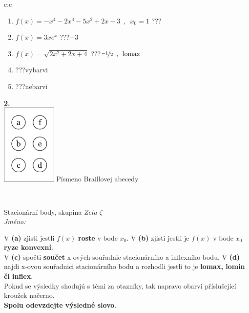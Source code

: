 \documentclass[10pt]{report}
\begin{document}
\begin{tabular}{c:c}
\begin{minipage}[c][104.5mm][t]{0.5\linewidth}
\begin{center}
\begin{minipage}{0.79\linewidth}
\begin{center}
\begin{varwidth}{\linewidth}
\begin{enumerate}
\item $f(x)=-x^4-2x^3-5x^2+2x-3\enspace , \enspace x_0=1$\quad \dotfill\; ???\;\dotfill \quad {}
\item $f(x)=3xe^{x}$\quad \dotfill\; ???\;\dotfill \quad $-3$
\item $f(x)=\sqrt{2x^2+2x+4}$\quad \dotfill\; ???\;\dotfill \quad $\nicefrac{-1}{2}\enspace , \enspace\mathrm{lomax}$
\item \quad \dotfill\; ???\;\dotfill \quad vybarvi
\item \quad \dotfill\; ???\;\dotfill \quad nebarvi
\end{enumerate}
\end{varwidth}
\end{center}
\end{minipage}
\begin{minipage}{0.20\linewidth}
\begin{center}
{\Huge\bfseries 2.} \\[2mm]
\includegraphics[height=40mm]{../images/braille.png}
{\small Písmeno Braillovej abecedy}
\end{center}
\end{minipage}
\end{center}
\end{minipage}
\\ \hdashline
\begin{minipage}[c][104.5mm][t]{0.5\linewidth}
\begin{center}
\vspace{7mm}
{\huge Stacionární body, skupina \textit{Zeta $\zeta$} -}\\[5mm]
\textit{Jméno:}\phantom{xxxxxxxxxxxxxxxxxxxxxxxxxxxxxxxxxxxxxxxxxxxxxxxxxxxxxxxxxxxxxxxxx}\\[5mm]
\begin{minipage}{0.95\linewidth}
\begin{center}
{\small V \textbf{(a)} zjisti jestli $f(x)$ \textbf{roste} v bode $x_0$. V \textbf{(b)} zjisti jestli je $f(x)$ v bode $x_0$ \textbf{ryze konvexní}.\\V \textbf{(c)} spočti \textbf{součet} x-ových souřadnic stacionárního a inflexního bodu. V \textbf{(d)} najdi x-ovou souřadnici stacionárního bodu a rozhodli jestli to je \textbf{lomax, lomin či inflex}.\\Pokud se výsledky shodujú s těmi za otazníky, tak napravo obarvi příslušející kroužek načerno.\\\textbf{Spolu odevzdejte výsledné slovo}}.

\end{center}
\end{minipage}
\end{center}
\end{minipage}
\end{tabular}
\end{document}
